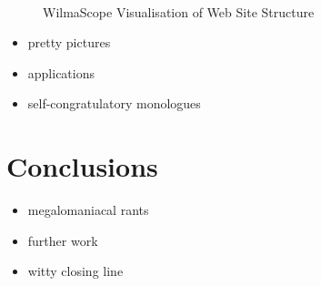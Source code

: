 \documentclass[runningheads]{cl2emult}
\begin{document}
\begin{figure}
\begin{center}
 \\
\caption{{\sc WilmaScope Visualisation of Web Site Structure}}
\label{fig-web}
\end{center}
\end{figure}

\begin{itemize}
\item pretty pictures
\item applications
\item self-congratulatory monologues
\end{itemize}

\section{Conclusions}
\label{sec:conclusions}
\begin{itemize}
\item megalomaniacal rants
\item further work
\item witty closing line
\end{itemize}
\end{document}

